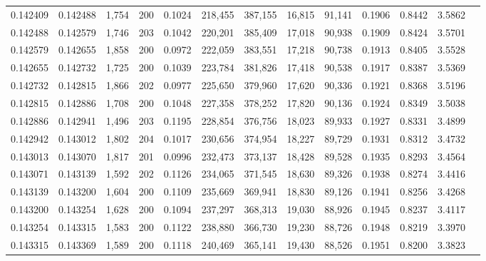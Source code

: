 \begin{tabular}{rrrrrrrrrrrrr}
0.142409 & 0.142488 & 1,754 & 200 &                                     0.1024 & 218,455 & 387,155 &  16,815 &  91,141 & 0.1906 & 0.8442 & 3.5862 \\
0.142488 & 0.142579 & 1,746 & 203 &                                     0.1042 & 220,201 & 385,409 &  17,018 &  90,938 & 0.1909 & 0.8424 & 3.5701 \\
0.142579 & 0.142655 & 1,858 & 200 &                                     0.0972 & 222,059 & 383,551 &  17,218 &  90,738 & 0.1913 & 0.8405 & 3.5528 \\
0.142655 & 0.142732 & 1,725 & 200 &                                     0.1039 & 223,784 & 381,826 &  17,418 &  90,538 & 0.1917 & 0.8387 & 3.5369 \\
0.142732 & 0.142815 & 1,866 & 202 &                                     0.0977 & 225,650 & 379,960 &  17,620 &  90,336 & 0.1921 & 0.8368 & 3.5196 \\
0.142815 & 0.142886 & 1,708 & 200 &                                     0.1048 & 227,358 & 378,252 &  17,820 &  90,136 & 0.1924 & 0.8349 & 3.5038 \\
0.142886 & 0.142941 & 1,496 & 203 &                                     0.1195 & 228,854 & 376,756 &  18,023 &  89,933 & 0.1927 & 0.8331 & 3.4899 \\
0.142942 & 0.143012 & 1,802 & 204 &                                     0.1017 & 230,656 & 374,954 &  18,227 &  89,729 & 0.1931 & 0.8312 & 3.4732 \\
0.143013 & 0.143070 & 1,817 & 201 &                                     0.0996 & 232,473 & 373,137 &  18,428 &  89,528 & 0.1935 & 0.8293 & 3.4564 \\
0.143071 & 0.143139 & 1,592 & 202 &                                     0.1126 & 234,065 & 371,545 &  18,630 &  89,326 & 0.1938 & 0.8274 & 3.4416 \\
0.143139 & 0.143200 & 1,604 & 200 &                                     0.1109 & 235,669 & 369,941 &  18,830 &  89,126 & 0.1941 & 0.8256 & 3.4268 \\
0.143200 & 0.143254 & 1,628 & 200 &                                     0.1094 & 237,297 & 368,313 &  19,030 &  88,926 & 0.1945 & 0.8237 & 3.4117 \\
0.143254 & 0.143315 & 1,583 & 200 &                                     0.1122 & 238,880 & 366,730 &  19,230 &  88,726 & 0.1948 & 0.8219 & 3.3970 \\
0.143315 & 0.143369 & 1,589 & 200 &                                     0.1118 & 240,469 & 365,141 &  19,430 &  88,526 & 0.1951 & 0.8200 & 3.3823 \\

\end{tabular}
